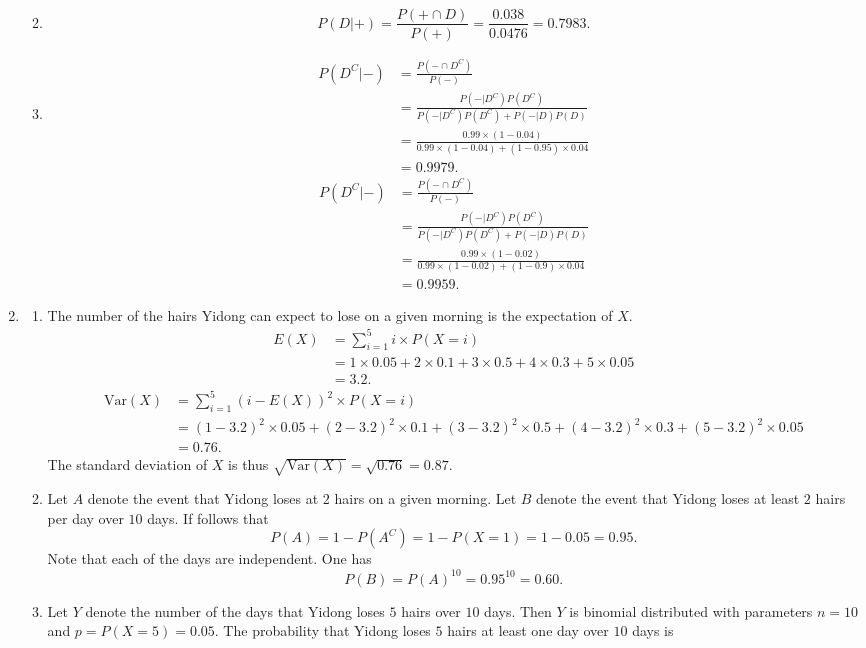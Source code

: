 \documentclass{article}
\begin{document}
\begin{enumerate}
\begin{enumerate}
\begin{align*}
      	\end{align*}
      	\item $$P(D|+)=\frac{P(+\cap D)}{P(+)}=\frac{0.038}{0.0476}=0.7983.$$
      	\item 
      	\begin{align*}
        P(D^C|-)&=\frac{P(-\cap D^C)}{P(-)}\\&=\frac{P(-|D^C)P(D^C)}{P(-|D^C)P(D^C)+P(-|D)P(D)}\\&=\frac{0.99\times(1-0.04)}{0.99\times(1-0.04)+(1-0.95)\times0.04}\\&=0.9979.
      	\end{align*}
      	\begin{align*}
        P(D^C|-)&=\frac{P(-\cap D^C)}{P(-)}\\&=\frac{P(-|D^C)P(D^C)}{P(-|D^C)P(D^C)+P(-|D)P(D)}\\&=\frac{0.99\times(1-0.02)}{0.99\times(1-0.02)+(1-0.9)\times0.04}\\&=0.9959.
      	\end{align*}
    \end{enumerate}
    \item 
    \begin{enumerate}
        \item The number of the hairs Yidong can expect to lose on a given morning is the expectation of $X$.
    	\begin{align*}
        E(X)&=\sum_{i=1}^5i\times P(X=i)\\&=1\times0.05+2\times0.1+3\times0.5+4\times0.3+5\times0.05\\&=3.2.
    	\end{align*}
    	\begin{align*}
        \mathrm{Var}(X)&=\sum_{i=1}^5(i-E(X))^2\times P(X=i)\\&=(1-3 .2)^2\times0.05+(2-3.2)^2\times0.1+(3-3.2)^2\times0.5+(4-3.2)^2\times0.3+(5-3.2)^2\times0.05\\&=0.76.
    	\end{align*}
    	The standard deviation of $X$ is thus $\sqrt{\mathrm{Var}(X)}=\sqrt{0.76}=0.87$.
    	\item Let $A$ denote the event that Yidong loses at $2$ hairs on a given morning. Let $B$ denote the event that Yidong loses at least $2$ hairs per day over $10$ days. If follows that
    	$$P(A)=1-P(A^C)=1-P(X=1)=1-0.05=0.95.$$
    	Note that each of the days are independent. One has
    	$$P(B)=P(A)^{10}=0.95^{10}=0.60.$$
    	\item Let $Y$ denote the number of the days that Yidong loses $5$ hairs over $10$ days. Then $Y$ is binomial distributed with parameters $n=10$ and $p=P(X=5)=0.05$. The probability that Yidong loses $5$ hairs at least one day over $10$ days is 

\end{enumerate}
\end{enumerate}
\end{document}
